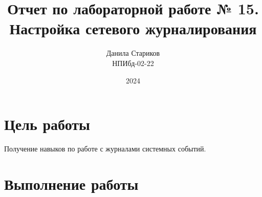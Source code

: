 

\title{Отчет по лабораторной работе № 15. \\ Настройка сетевого журналирования}
\author{Данила Стариков \\ НПИбд-02-22}
\date{2024}



\maketitle
\newpage

\tableofcontents

\newpage
\section{Цель работы}
Получение навыков по работе с журналами системных событий.
\newpage

\section{Выполнение работы}
